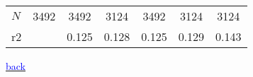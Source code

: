 \documentclass[10pt,letterpaper,subeqn]{beamer}
\begin{document}
\begin{frame}[label=placebo1]
\begin{table}[htbp]
\begin{tabular}{l*{6}{c}}
\hline
\(N\)       &        3492         &        3492         &        3124         &        3492         &        3124         &        3124         \\
r2          &                     &       0.125         &       0.128         &       0.125         &       0.129         &       0.143         \\
\hline\hline
\end{tabular}
\end{table}


{\footnotesize \hyperlink{placebos}{\textcolor{blue}{back}}}
\end{frame}
\end{document}
